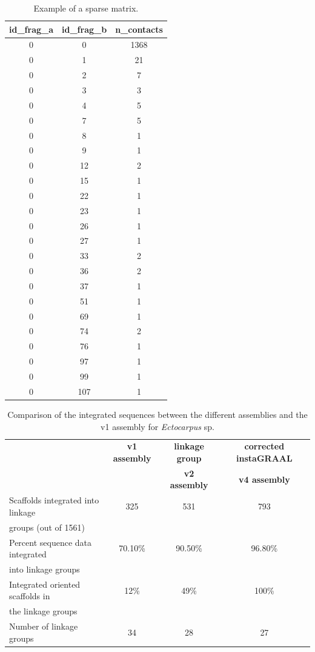 \begin{suppsection}
\beginsupplement

\begin{table}[ht]
\centering
\caption{Example of a sparse matrix.}
\begin{tabular}{|c|c|c|}
\hline
\textbf{id\_frag\_a} & \textbf{id\_frag\_b} & \textbf{n\_contacts} \\
\hline
0 & 0 & 1368 \\
0 & 1 & 21 \\
0 & 2 & 7 \\
0 & 3 & 3 \\
0 & 4 & 5 \\
0 & 7 & 5 \\
0 & 8 & 1 \\
0 & 9 & 1 \\
0 & 12 & 2 \\
0 & 15 & 1 \\
0 & 22 & 1 \\
0 & 23 & 1 \\
0 & 26 & 1 \\
0 & 27 & 1 \\
0 & 33 & 2 \\
0 & 36 & 2 \\
0 & 37 & 1 \\
0 & 51 & 1 \\
0 & 69 & 1 \\
0 & 74 & 2 \\
0 & 76 & 1 \\
0 & 97 & 1 \\
0 & 99 & 1 \\
0 & 107 & 1 \\
\hline
\end{tabular}
\label{tab:t1}
\end{table}

\begin{table}[ht]
\centering
\caption{Comparison of the integrated sequences between the different assemblies and the v1 assembly for \textit{Ectocarpus} sp.}
\begin{tabular}{|l|c|c|c|}
\hline
    & \textbf{v1 assembly} & \textbf{linkage group} & \textbf{corrected instaGRAAL} \\
    &  & \textbf{v2 assembly} & \textbf{v4 assembly} \\
\hline
Scaffolds integrated into linkage & 325 & 531 & 793 \\
groups (out of 1561) &  &  &  \\
\hline
Percent sequence data integrated & 70.10\% & 90.50\% & 96.80\% \\
into linkage groups &  &  &  \\
\hline
Integrated oriented scaffolds in & 12\% & 49\% & 100\% \\
the linkage groups &  &  &  \\
\hline
Number of linkage groups & 34 & 28 & 27 \\
\hline
\end{tabular}
\label{tab:t2}
\end{table}


\end{suppsection}
